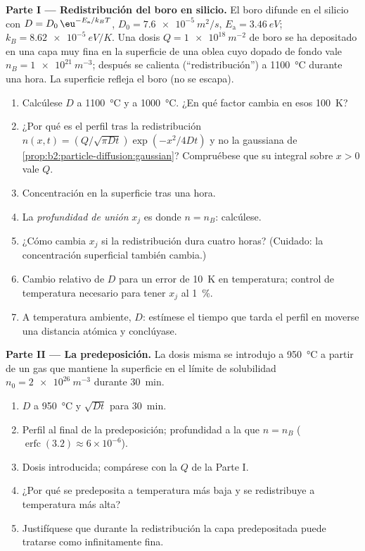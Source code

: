 \begin{problem}\label{pb:b2:particle-diffusion:1}
\textbf{Parte I --- Redistribución del boro en silicio.}
El boro difunde en el silicio con $D = D_0\,\eu^{-E_{\text{a}}/k_BT}$, $D_0 =
\qty{7.6e-5}{m^2/s}$, $E_{\text{a}} = \qty{3.46}{eV}$; $k_B =
\qty{8.62e-5}{eV/K}$. Una dosis $Q = \qty{1e18}{m^{-2}}$ de boro se ha
depositado en una capa muy fina en la superficie de una oblea cuyo
dopado de fondo vale $n_B = \qty{1e21}{m^{-3}}$; después se calienta
(``redistribución'') a \qty{1100}{\celsius} durante una hora. La superficie
refleja el boro (no se escapa).
\begin{enumerate}
  \item Calcúlese $D$ a \qty{1100}{\celsius} y a \qty{1000}{\celsius}.
        ¿En qué factor cambia en esos \qty{100}{K}?
  \item ¿Por qué es el perfil tras la redistribución $n(x,t) = (Q/\sqrt{\pi
        Dt})\exp(-x^2/4Dt)$ y no la gaussiana de
        \cref{prop:b2:particle-diffusion:gaussian}? Compruébese que su
        integral sobre $x > 0$ vale $Q$.
  \item Concentración en la superficie tras una hora.
  \item La \emph{profundidad de unión} $x_j$ es donde $n = n_B$: calcúlese.
  \item ¿Cómo cambia $x_j$ si la redistribución dura cuatro horas?
        (Cuidado: la concentración superficial también cambia.)
  \item Cambio relativo de $D$ para un error de \qty{10}{K} en temperatura;
        control de temperatura necesario para tener $x_j$ al \qty{1}{\%}.
  \item A temperatura ambiente, $D$: estímese el tiempo que tarda el perfil en
        moverse una distancia atómica y conclúyase.
\end{enumerate}

\textbf{Parte II --- La predeposición.}
La dosis misma se introdujo a \qty{950}{\celsius} a partir de un gas que mantiene
la superficie en el límite de solubilidad $n_0 = \qty{2e26}{m^{-3}}$ durante
\qty{30}{min}.
\begin{enumerate}[resume]
  \item $D$ a \qty{950}{\celsius} y $\sqrt{Dt}$ para \qty{30}{min}.
  \item Perfil al final de la predeposición; profundidad a la que $n =
        n_B$ ($\operatorname{erfc}(3.2) \approx 6 \times 10^{-6}$).
  \item Dosis introducida; compárese con la $Q$ de la Parte I.
  \item ¿Por qué se predeposita a temperatura más baja y se redistribuye a
        temperatura más alta?
  \item Justifíquese que durante la redistribución la capa predepositada puede
        tratarse como infinitamente fina.
\end{enumerate}


\end{problem}
